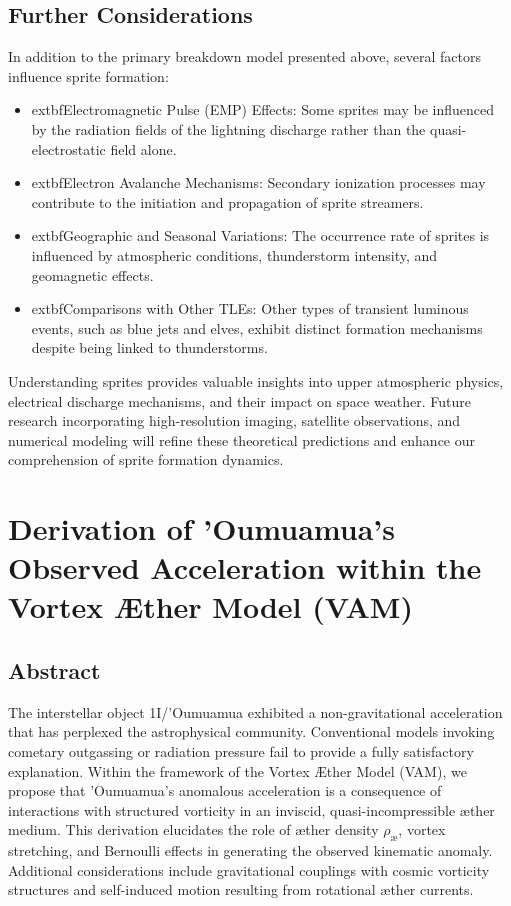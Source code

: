 \documentclass[a4paper,10pt]{article}
\begin{document}
\subsection*{Further Considerations}
In addition to the primary breakdown model presented above, several factors influence sprite formation:


\begin{itemize}
\item 	extbf{Electromagnetic Pulse (EMP) Effects:} Some sprites may be influenced by the radiation fields of the lightning discharge rather than the quasi-electrostatic field alone.
\item 	extbf{Electron Avalanche Mechanisms:} Secondary ionization processes may contribute to the initiation and propagation of sprite streamers.
\item 	extbf{Geographic and Seasonal Variations:} The occurrence rate of sprites is influenced by atmospheric conditions, thunderstorm intensity, and geomagnetic effects.
\item 	extbf{Comparisons with Other TLEs:} Other types of transient luminous events, such as blue jets and elves, exhibit distinct formation mechanisms despite being linked to thunderstorms.
\end{itemize}


Understanding sprites provides valuable insights into upper atmospheric physics, electrical discharge mechanisms, and their impact on space weather. Future research incorporating high-resolution imaging, satellite observations, and numerical modeling will refine these theoretical predictions and enhance our comprehension of sprite formation dynamics.


    

    \section{Derivation of 'Oumuamua's Observed Acceleration within the Vortex Æther Model (VAM)}

    \subsection*{Abstract}
    The interstellar object 1I/'Oumuamua exhibited a non-gravitational acceleration that has perplexed the astrophysical community. Conventional models invoking cometary outgassing or radiation pressure fail to provide a fully satisfactory explanation. Within the framework of the Vortex Æther Model (VAM), we propose that 'Oumuamua's anomalous acceleration is a consequence of interactions with structured vorticity in an inviscid, quasi-incompressible æther medium. This derivation elucidates the role of æther density $\rho_\text{\ae}$, vortex stretching, and Bernoulli effects in generating the observed kinematic anomaly. Additional considerations include gravitational couplings with cosmic vorticity structures and self-induced motion resulting from rotational æther currents.
\end{document}
